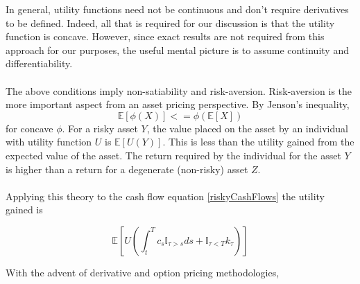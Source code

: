 \documentclass{article}
\theoremstyle{definition}
\begin{document}
In general, utility functions need not be continuous and don't require derivatives to be defined.  Indeed, all that is required for our discussion is that the utility function is concave.  However, since exact results are not required from this approach for our purposes, the useful mental picture is to assume continuity and differentiability.
\\
\\
The above conditions imply non-satiability and risk-aversion.  Risk-aversion is the more important aspect from an asset pricing perspective.  By Jenson's inequality, 
\[\mathbb{E}[\phi(X)]<=\phi(\mathbb{E}[X])\]
for concave \(\phi\).  For a risky asset \(Y\), the value placed on the asset by an individual with utility function \(U\) is \(\mathbb{E}[U(Y)]\).  This is less than the utility gained from the expected value of the asset.  The return required by the individual for the asset \(Y\) is higher than a return for a degenerate (non-risky) asset \(Z\).   
\\
\\
Applying this theory to the cash flow equation \ref{riskyCashFlows} the utility gained is

\[\mathbb{E}\left[U\left( \int_t ^ T c_s \mathbb{I}_{\tau>s} ds+\mathbb{I}_{\tau<T} k_\tau \right) \right]\]

With the advent of derivative and option pricing methodologies, 
\end{document}
